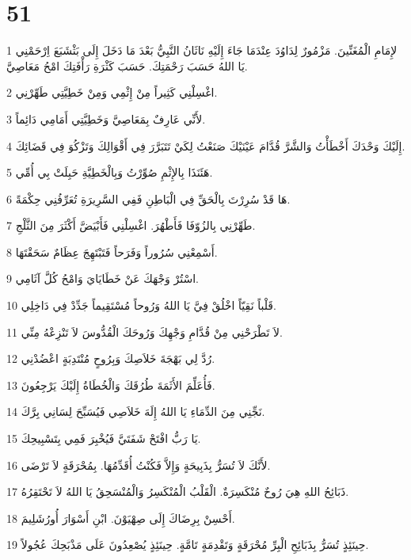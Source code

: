 \chapter{51}

\par 1 لإِمَامِ الْمُغَنِّينَ. مَزْمُورٌ لِدَاوُدَ عِنْدَمَا جَاءَ إِلَيْهِ نَاثَانُ النَّبِيُّ بَعْدَ مَا دَخَلَ إِلَى بَثْشَبَعَ اِرْحَمْنِي يَا اللهُ حَسَبَ رَحْمَتِكَ. حَسَبَ كَثْرَةِ رَأْفَتِكَ امْحُ مَعَاصِيَّ.
\par 2 اغْسِلْنِي كَثِيراً مِنْ إِثْمِي وَمِنْ خَطِيَّتِي طَهِّرْنِي.
\par 3 لأَنِّي عَارِفٌ بِمَعَاصِيَّ وَخَطِيَّتِي أَمَامِي دَائِماً.
\par 4 إِلَيْكَ وَحْدَكَ أَخْطَأْتُ وَالشَّرَّ قُدَّامَ عَيْنَيْكَ صَنَعْتُ لِكَيْ تَتَبَرَّرَ فِي أَقْوَالِكَ وَتَزْكُوَ فِي قَضَائِكَ.
\par 5 هَئَنَذَا بِالإِثْمِ صُوِّرْتُ وَبِالْخَطِيَّةِ حَبِلَتْ بِي أُمِّي.
\par 6 هَا قَدْ سُرِرْتَ بِالْحَقِّ فِي الْبَاطِنِ فَفِي السَّرِيرَةِ تُعَرِّفُنِي حِكْمَةً.
\par 7 طَهِّرْنِي بِالزُوّفَا فَأَطْهُرَ. اغْسِلْنِي فَأَبْيَضَّ أَكْثَرَ مِنَ الثَّلْجِ.
\par 8 أَسْمِعْنِي سُرُوراً وَفَرَحاً فَتَبْتَهِجَ عِظَامٌ سَحَقْتَهَا.
\par 9 اسْتُرْ وَجْهَكَ عَنْ خَطَايَايَ وَامْحُ كُلَّ آثَامِي.
\par 10 قَلْباً نَقِيّاً اخْلُقْ فِيَّ يَا اللهُ وَرُوحاً مُسْتَقِيماً جَدِّدْ فِي دَاخِلِي.
\par 11 لاَ تَطْرَحْنِي مِنْ قُدَّامِ وَجْهِكَ وَرُوحَكَ الْقُدُّوسَ لاَ تَنْزِعْهُ مِنِّي.
\par 12 رُدَّ لِي بَهْجَةَ خَلاَصِكَ وَبِرُوحٍ مُنْتَدِبَةٍ اعْضُدْنِي.
\par 13 فَأُعَلِّمَ الأَثَمَةَ طُرُقَكَ وَالْخُطَاةُ إِلَيْكَ يَرْجِعُونَ.
\par 14 نَجِّنِي مِنَ الدِّمَاءِ يَا اللهُ إِلَهَ خَلاَصِي فَيُسَبِّحَ لِسَانِي بِرَّكَ.
\par 15 يَا رَبُّ افْتَحْ شَفَتَيَّ فَيُخْبِرَ فَمِي بِتَسْبِيحِكَ.
\par 16 لأَنَّكَ لاَ تُسَرُّ بِذَبِيحَةٍ وَإِلاَّ فَكُنْتُ أُقَدِّمُهَا. بِمُحْرَقَةٍ لاَ تَرْضَى.
\par 17 ذَبَائِحُ اللهِ هِيَ رُوحٌ مُنْكَسِرَةٌ. الْقَلْبُ الْمُنْكَسِرُ وَالْمُنْسَحِقُ يَا اللهُ لاَ تَحْتَقِرُهُ.
\par 18 أَحْسِنْ بِرِضَاكَ إِلَى صِهْيَوْنَ. ابْنِ أَسْوَارَ أُورُشَلِيمَ.
\par 19 حِينَئِذٍ تُسَرُّ بِذَبَائِحِ الْبِرِّ مُحْرَقَةٍ وَتَقْدِمَةٍ تَامَّةٍ. حِينَئِذٍ يُصْعِدُونَ عَلَى مَذْبَحِكَ عُجُولاً.

